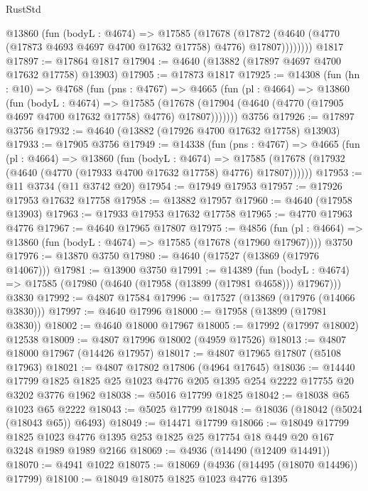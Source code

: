 \begin{lexlean}{RustStd}
\begin{coremodule}
          @13860
            (fun (bodyL : @4674) =>
            @17585
              (@17678
                (@17872 (@4640 (@4770 (@17873 @4693 @4697 @4700 @17632 @17758) @4776) @17807))))))))
    @1817
@17897 := @17864 @1817
@17904 := @4640 (@13882 (@17897 @4697 @4700 @17632 @17758) @13903)
@17905 := @17873 @1817
@17925 := @14308
    (fun (hn : @10) =>
    @4768
      (fun (pns : @4767) =>
      @4665
        (fun (pl : @4664) =>
        @13860
          (fun (bodyL : @4674) =>
          @17585
            (@17678 (@17904 (@4640 (@4770 (@17905 @4697 @4700 @17632 @17758) @4776) @17807)))))))
    @3756
@17926 := @17897 @3756
@17932 := @4640 (@13882 (@17926 @4700 @17632 @17758) @13903)
@17933 := @17905 @3756
@17949 := @14338
    (fun (pns : @4767) =>
    @4665
      (fun (pl : @4664) =>
      @13860
        (fun (bodyL : @4674) =>
        @17585 (@17678 (@17932 (@4640 (@4770 (@17933 @4700 @17632 @17758) @4776) @17807))))))
@17953 := @11 @3734 (@11 @3742 @20)
@17954 := @17949 @17953
@17957 := @17926 @17953 @17632 @17758
@17958 := @13882 @17957
@17960 := @4640 (@17958 @13903)
@17963 := @17933 @17953 @17632 @17758
@17965 := @4770 @17963 @4776
@17967 := @4640 @17965 @17807
@17975 := @4856
    (fun (pl : @4664) => @13860 (fun (bodyL : @4674) => @17585 (@17678 (@17960 @17967))))
    @3750
@17976 := @13870 @3750
@17980 := @4640 (@17527 (@13869 (@17976 @14067)))
@17981 := @13900 @3750
@17991 := @14389
    (fun (bodyL : @4674) => @17585 (@17980 (@4640 (@17958 (@13899 (@17981 @4658))) @17967)))
    @3830
@17992 := @4807 @17584
@17996 := @17527 (@13869 (@17976 (@14066 @3830)))
@17997 := @4640 @17996
@18000 := @17958 (@13899 (@17981 @3830))
@18002 := @4640 @18000 @17967
@18005 := @17992 (@17997 @18002) @12538
@18009 := @4807 @17996 @18002 (@4959 @17526)
@18013 := @4807 @18000 @17967 (@14426 @17957)
@18017 := @4807 @17965 @17807 (@5108 @17963)
@18021 := @4807 @17802 @17806 (@4964 @17645)
@18036 := @14440
    @17799
    @1825
    @1825
    @25
    @1023
    @4776
    @205
    @1395
    @254
    @2222
    @17755
    @20
    @3202
    @3776
    @1962
@18038 := @5016 @17799 @1825
@18042 := @18038 @65 @1023 @65 @2222
@18043 := @5025 @17799
@18048 := @18036 (@18042 (@5024 (@18043 @65)) @6493)
@18049 := @14471 @17799
@18066 := @18049
    @17799
    @1825
    @1023
    @4776
    @1395
    @253
    @1825
    @25
    @17754
    @18
    @449
    @20
    @167
    @3248
    @1989
    @1989
    @2166
@18069 := @4936 (@14490 (@12409 @14491))
@18070 := @4941 @1022
@18075 := @18069 (@4936 (@14495 (@18070 @14496)) @17799)
@18100 := @18049
    @18075
    @1825
    @1023
    @4776
    @1395

\end{coremodule}
\end{lexlean}
